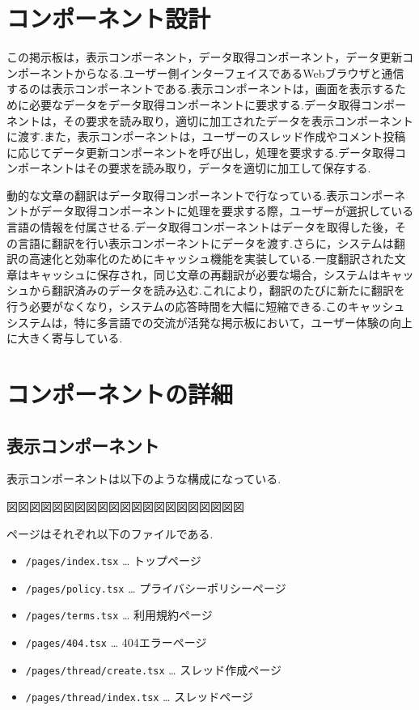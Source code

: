 \documentclass[b5paper,12pt]{jsreport}
\begin{document}

\section{コンポーネント設計}

この掲示板は，表示コンポーネント，データ取得コンポーネント，データ更新コンポーネントからなる.ユーザー側インターフェイスであるWebブラウザと通信するのは表示コンポーネントである.表示コンポーネントは，画面を表示するために必要なデータをデータ取得コンポーネントに要求する.データ取得コンポーネントは，その要求を読み取り，適切に加工されたデータを表示コンポーネントに渡す.また，表示コンポーネントは，ユーザーのスレッド作成やコメント投稿に応じてデータ更新コンポーネントを呼び出し，処理を要求する.データ取得コンポーネントはその要求を読み取り，データを適切に加工して保存する.

動的な文章の翻訳はデータ取得コンポーネントで行なっている.表示コンポーネントがデータ取得コンポーネントに処理を要求する際，ユーザーが選択している言語の情報を付属させる.データ取得コンポーネントはデータを取得した後，その言語に翻訳を行い表示コンポーネントにデータを渡す.さらに，システムは翻訳の高速化と効率化のためにキャッシュ機能を実装している.一度翻訳された文章はキャッシュに保存され，同じ文章の再翻訳が必要な場合，システムはキャッシュから翻訳済みのデータを読み込む.これにより，翻訳のたびに新たに翻訳を行う必要がなくなり，システムの応答時間を大幅に短縮できる.このキャッシュシステムは，特に多言語での交流が活発な掲示板において，ユーザー体験の向上に大きく寄与している.

\section{コンポーネントの詳細}


\subsection*{表示コンポーネント}

表示コンポーネントは以下のような構成になっている.

図図図図図図図図図図図図図図図図図図図図図

ページはそれぞれ以下のファイルである.

\begin{itemize}
    \item \texttt{/pages/index.tsx} … トップページ
    \item \texttt{/pages/policy.tsx} … プライバシーポリシーページ
    \item \texttt{/pages/terms.tsx} … 利用規約ページ
    \item \texttt{/pages/404.tsx} … 404エラーページ
    \item \texttt{/pages/thread/create.tsx} … スレッド作成ページ
    \item \texttt{/pages/thread/index.tsx} … スレッドページ
\end{itemize}
\end{document}
